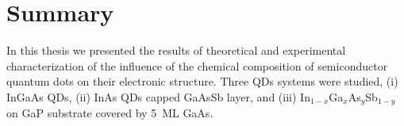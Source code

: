 
\chapter{Summary}\label{chap:summary}

In this thesis we presented the results of theoretical and experimental characterization of the influence of the chemical composition of semiconductor quantum dots on their electronic structure. Three QDs systems were studied, (i) InGaAs QDs, (ii) InAs QDs capped GaAsSb layer, and (iii) In$_{1-x}$Ga$_x$As$_y$Sb$_{1-y}$ on GaP substrate covered by 5~ML GaAs.
\newpage

\newpage 